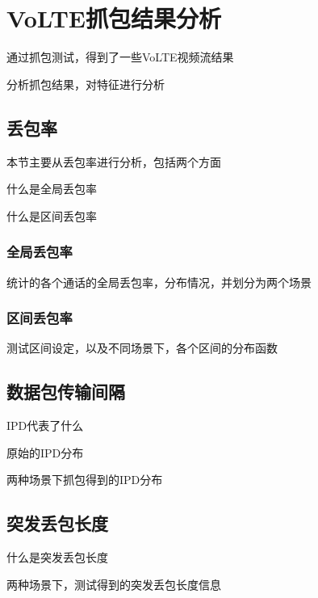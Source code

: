 \section{VoLTE抓包结果分析}
\label{chap:analyze:results}

通过抓包测试，得到了一些VoLTE视频流结果

分析抓包结果，对特征进行分析

\subsection{丢包率}
\label{chap:analyze:results:plr}

本节主要从丢包率进行分析，包括两个方面

什么是全局丢包率

什么是区间丢包率

\subsubsection{全局丢包率}
\label{chap:analyze:results:plr:global}

统计的各个通话的全局丢包率，分布情况，并划分为两个场景

\subsubsection{区间丢包率}
\label{chap:analyze:results:plr:window}

测试区间设定，以及不同场景下，各个区间的分布函数

\subsection{数据包传输间隔}
\label{chap:analyze:results:ipd}

IPD代表了什么

原始的IPD分布

两种场景下抓包得到的IPD分布

\subsection{突发丢包长度}
\label{chap:analyze:results:burst}

什么是突发丢包长度

两种场景下，测试得到的突发丢包长度信息
